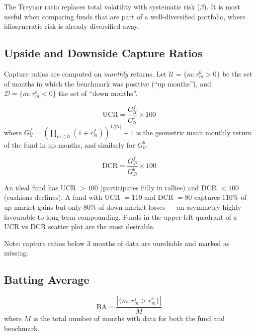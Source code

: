 \documentclass[12pt, a4paper]{article}
\begin{document}
The Treynor ratio replaces total volatility with systematic risk ($\beta$).
It is most useful when comparing funds that are part of a well-diversified
portfolio, where idiosyncratic risk is already diversified away.

\subsection{Upside and Downside Capture Ratios}

Capture ratios are computed on \emph{monthly} returns.  Let
$\mathcal{U} = \{m : r_m^b > 0\}$ be the set of months in which the
benchmark was positive (``up months''), and
$\mathcal{D} = \{m : r_m^b < 0\}$ the set of ``down months''.

\begin{definition}
\[
  \mathrm{UCR} = \frac{G_{\mathcal{U}}^f}{G_{\mathcal{U}}^b} \times 100
\]
where $G_{\mathcal{U}}^f = \left(\prod_{m \in \mathcal{U}}(1 + r_m^f)\right)^{1/|\mathcal{U}|} - 1$
is the geometric mean monthly return of the fund in up months, and
similarly for $G_{\mathcal{U}}^b$.
\end{definition}

\begin{definition}
\[
  \mathrm{DCR} = \frac{G_{\mathcal{D}}^f}{G_{\mathcal{D}}^b} \times 100
\]
\end{definition}

\begin{interpretation}
An ideal fund has UCR $> 100$ (participates fully in rallies) and
DCR $< 100$ (cushions declines).  A fund with UCR $= 110$ and DCR $= 80$
captures 110\% of up-market gains but only 80\% of down-market losses —
an asymmetry highly favourable to long-term compounding.  Funds in the
upper-left quadrant of a UCR vs DCR scatter plot are the most desirable.

Note: capture ratios below 3 months of data are unreliable and
marked as missing.
\end{interpretation}

\subsection{Batting Average}

\begin{definition}
\[
  \mathrm{BA} = \frac{|\{m : r_m^f > r_m^b\}|}{M}
\]
where $M$ is the total number of months with data for both the fund and
benchmark.
\end{definition}
\end{document}
